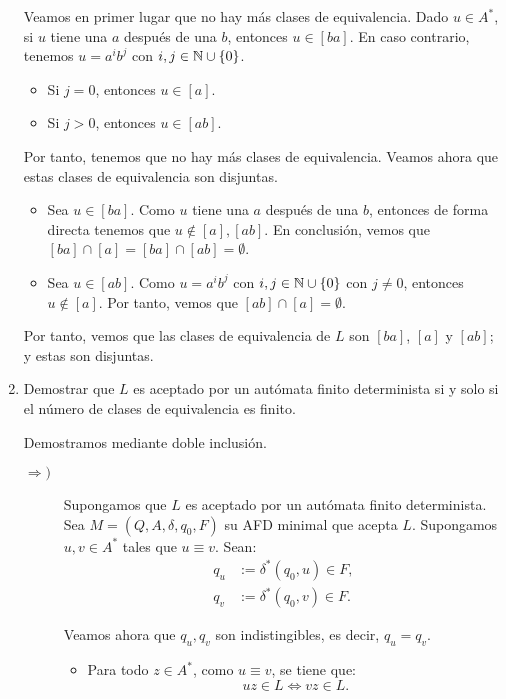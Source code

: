 \begin{ejercicio}
\begin{enumerate}
        Veamos en primer lugar que no hay más clases de equivalencia. Dado $u\in A^*$, si $u$ tiene una $a$ después de una $b$, entonces $u\in [ba]$. En caso contrario, tenemos $u=a^ib^j$ con $i,j\in \mathbb{N}\cup \{0\}$.
        \begin{itemize}
            \item Si $j=0$, entonces $u\in [a]$.
            \item Si $j>0$, entonces $u\in [ab]$.
        \end{itemize}
        Por tanto, tenemos que no hay más clases de equivalencia. Veamos ahora que estas clases de equivalencia son disjuntas.
        \begin{itemize}
            \item Sea $u\in [ba]$. Como $u$ tiene una $a$ después de una $b$, entonces de forma directa tenemos que $u\notin [a], [ab]$.
            En conclusión, vemos que $[ba]\cap [a]=[ba]\cap [ab]=\emptyset$.

            \item Sea $u\in [ab]$. Como $u=a^ib^j$ con $i,j\in \mathbb{N}\cup \{0\}$ con $j\neq 0$, entonces $u\notin [a]$. Por tanto, vemos que $[ab]\cap [a]=\emptyset$.
        \end{itemize}

        Por tanto, vemos que las clases de equivalencia de $L$ son $[ba]$, $[a]$ y $[ab]$; y estas son disjuntas.

        \item Demostrar que $L$ es aceptado por un autómata finito determinista si y solo si el número de clases de equivalencia es finito.
        
        Demostramos mediante doble inclusión.
        \begin{description}
            \item[$\Longrightarrow)$] Supongamos que $L$ es aceptado por un autómata finito determinista. Sea $M=(Q, A, \delta, q_0, F)$ su AFD minimal que acepta $L$.
            Supongamos $u,v\in A^*$ tales que $u\equiv v$. Sean:
            \begin{align*}
                q_u &:= \delta^{\ast}(q_0, u)\in F,\\
                q_v &:= \delta^{\ast}(q_0, v)\in F.
            \end{align*}

            Veamos ahora que $q_u,q_v$ son indistingibles, es decir, $q_u=q_v$.
            \begin{itemize}
                \item Para todo $z\in A^*$, como $u\equiv v$, se tiene que:
                \begin{equation*}
                    uz\in L\Leftrightarrow vz\in L.
                \end{equation*}
    

\end{itemize}
\end{description}
\end{enumerate}
\end{ejercicio}
